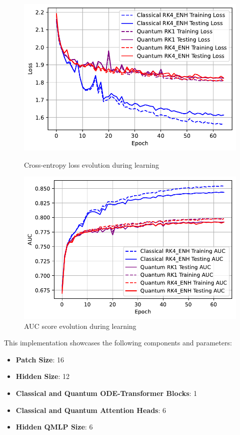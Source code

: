 \documentclass[12pt,a4paper]{report}
\begin{document}
\begin{figure}[th]
  \centering
  \includegraphics[scale=0.88]{./pics/new_pdf_graphs/hybrid/hybrid_transfomer_loss_cifar10_rk4_enh.pdf}
  \caption[Cross-entropy loss evolution during learning]{Cross-entropy loss evolution during learning}
  \label{fig:p35}
  \vspace*{\floatsep}
  \centering
  \includegraphics[scale=0.88]{./pics/new_pdf_graphs/hybrid/hybrid_auc_cifar10_.pdf}
  \caption[AUC score evolution during learning]{AUC score evolution during learning}
  \label{fig:p36}
\end{figure}

This implementation showcases the following components and parameters:
\begin{itemize}
  \item \textbf{Patch Size}: 16
  \item \textbf{Hidden Size}: 12
  \item \textbf{Classical and Quantum ODE-Transformer Blocks}: 1
  \item \textbf{Classical and Quantum Attention Heads}: 6
  \item \textbf{Hidden QMLP Size}: 6
\end{itemize}
\end{document}
